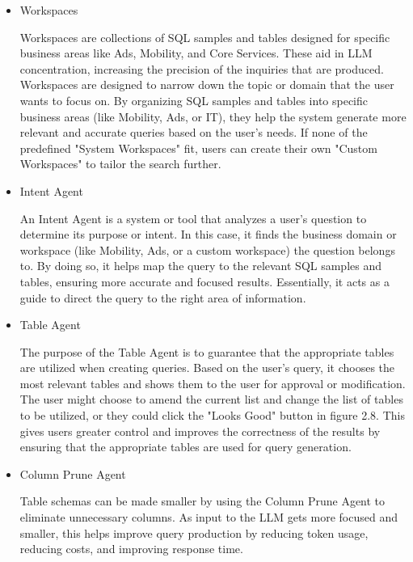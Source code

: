         \begin{itemize}
            \item  Workspaces

            Workspaces are collections of SQL samples and tables designed for specific business areas like Ads, Mobility, and Core Services. These aid in LLM concentration, increasing the precision of the inquiries that are produced. Workspaces are designed to narrow down the topic or domain that the user wants to focus on. By organizing SQL samples and tables into specific business areas (like Mobility, Ads, or IT), they help the system generate more relevant and accurate queries based on the user's needs. If none of the predefined "System Workspaces" fit, users can create their own "Custom Workspaces" to tailor the search further.
            \item  Intent Agent

            An Intent Agent is a system or tool that analyzes a user's question to determine its purpose or intent. In this case, it finds the business domain or workspace (like Mobility, Ads, or a custom workspace) the question belongs to. By doing so, it helps map the query to the relevant SQL samples and tables, ensuring more accurate and focused results. Essentially, it acts as a guide to direct the query to the right area of information.
            \item  Table Agent

            The purpose of the Table Agent is to guarantee that the appropriate tables are utilized when creating queries. Based on the user's query, it chooses the most relevant tables and shows them to the user for approval or modification. The user might choose to amend the current list and change the list of tables to be utilized, or they could click the "Looks Good" button in figure 2.8. This gives users greater control and improves the correctness of the results by ensuring that the appropriate tables are used for query generation.
            \item Column Prune Agent

            Table schemas can be made smaller by using the Column Prune Agent to eliminate unnecessary columns. As input to the LLM gets more focused and smaller, this helps improve query production by reducing token usage, reducing costs, and improving response time.
        \end{itemize}
